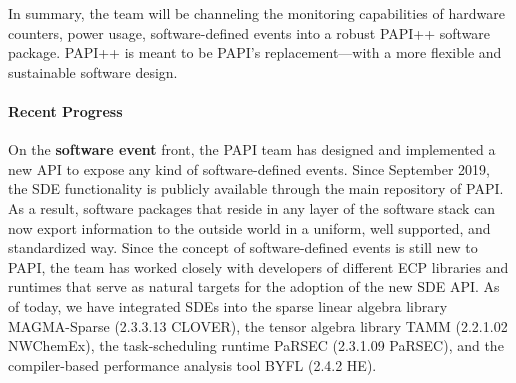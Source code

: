 In summary, the team will be channeling the monitoring capabilities of hardware 
counters, power usage, software-defined events into a robust PAPI++ software 
package. PAPI++ is meant to be PAPI's replacement---with a more flexible and 
sustainable software design.


\paragraph{Recent Progress}

On the \textbf{software event} front, the PAPI team has designed and implemented 
a new API to expose any kind of software-defined events. Since September 2019,
the SDE functionality is publicly available through the main repository of PAPI. 
As a result, software packages that reside in any layer of the software stack can now 
export information to the outside world in a uniform, well supported, and 
standardized way. 
Since the concept of software-defined events is still new to PAPI, the team has worked
closely with developers of different ECP libraries and runtimes that serve as natural targets
for the adoption of the new SDE API.
As of today, we have integrated SDEs into the sparse linear algebra library MAGMA-Sparse 
(2.3.3.13 CLOVER), the tensor algebra library TAMM (2.2.1.02 NWChemEx), 
the task-scheduling runtime PaRSEC (2.3.1.09 PaRSEC), and the compiler-based 
performance analysis tool BYFL (2.4.2 HE). 

